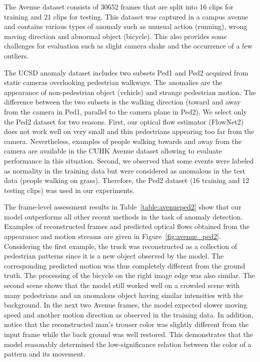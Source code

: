 \documentclass[10pt,twocolumn,letterpaper]{article}
\begin{document}
The Avenue dataset consists of 30652 frames that are split into 16 clips for training and 21 clips for testing. This dataset was captured in a campus avenue and contains various types of anomaly such as unusual action (\eg running), wrong moving direction and abnormal object (\eg bicycle). This also provides some challenges for evaluation such as slight camera shake and the occurrence of a few outliers.

The UCSD anomaly dataset includes two subsets Ped1 and Ped2 acquired from static cameras overlooking pedestrian walkways. The anomalies are the appearance of non-pedestrian object (\eg vehicle) and strange pedestrian motion. The difference between the two subsets is the walking direction (toward and away from the camera in Ped1, parallel to the camera plane in Ped2). We select only the Ped2 dataset for two reasons. First, our optical flow estimator (FlowNet2) does not work well on very small and thin pedestrians appearing too far from the camera. Nevertheless, examples of people walking towards and away from the camera are available in the CUHK Avenue dataset allowing to evaluate performance in this situation. Second, we observed that some events were labeled as normality in the training data but were considered as anomalous in the test data (\eg people walking on grass). Therefore, the Ped2 dataset (16 training and 12 testing clips) was used in our experiments.

The frame-level assessment results in Table~\ref{table:avenueped2} show that our model outperforms all other recent methods in the task of anomaly detection. Examples of reconstructed frames and predicted optical flows obtained from the appearance and motion streams are given in Figure~\ref{fig:avenue_ped2}. Considering the first example, the truck was reconstructed as a collection of pedestrian patterns since it is a new object observed by the model. The corresponding predicted motion was thus completely different from the ground truth. The processing of the bicycle on the right image edge was also similar. The second scene shows that the model still worked well on a crowded scene with many pedestrians and an anomalous object having similar intensities with the background. In the next two Avenue frames, the model expected slower moving speed and another motion direction as observed in the training data. In addition, notice that the reconstructed man's trouser color was slightly different from the input frame while the back ground was well restored. This demonstrates that the model reasonably determined the low-significance relation between the color of a pattern and its movement.
\end{document}
